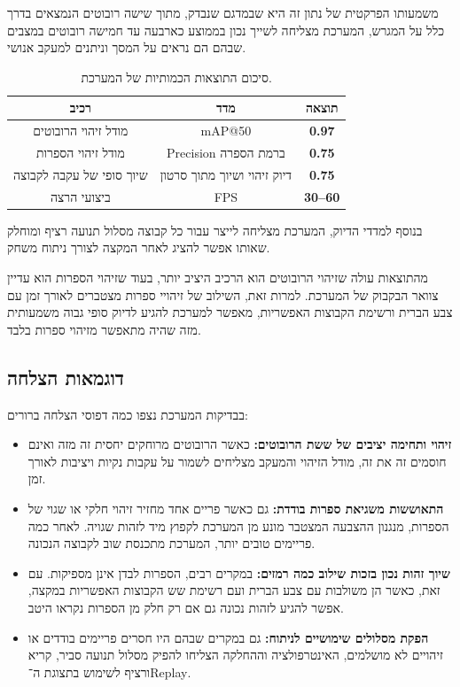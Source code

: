 משמעותו הפרקטית של נתון זה היא שבמדגם שנבדק, מתוך שישה רובוטים
הנמצאים בדרך כלל על המגרש, המערכת מצליחה לשייך נכון בממוצע כארבעה עד
חמישה רובוטים במצבים שבהם הם נראים על המסך וניתנים למעקב אנושי.

\begin{table}[H]
  \centering
  \begin{tabular}{|c|c|c|}
    \hline
    \textbf{רכיב} & \textbf{מדד} & \textbf{תוצאה} \\ \hline
    מודל זיהוי הרובוטים & \textenglish{mAP@50} & \textbf{0.97} \\ \hline
    מודל זיהוי הספרות &\textenglish{Precision}  ברמת הספרה & \textbf{0.75} \\ \hline
    שיוך סופי של עקבה לקבוצה & דיוק זיהוי ושיוך מתוך סרטון & \textbf{0.75} \\ \hline
    ביצועי הרצה & \textenglish{FPS} & \textbf{30--60} \\ \hline
  \end{tabular}
  \caption{סיכום התוצאות הכמותיות של המערכת.}
\end{table}

בנוסף למדדי הדיוק, המערכת מצליחה לייצר עבור כל קבוצה מסלול תנועה רציף
ומוחלק שאותו אפשר להציג לאחר המקצה לצורך ניתוח משחק.

מהתוצאות עולה שזיהוי הרובוטים הוא הרכיב היציב יותר, בעוד שזיהוי הספרות
הוא עדיין צוואר הבקבוק של המערכת. למרות זאת, השילוב של זיהויי ספרות
מצטברים לאורך זמן עם צבע הברית ורשימת הקבוצות האפשריות, מאפשר למערכת
להגיע לדיוק סופי גבוה משמעותית מזה שהיה מתאפשר מזיהוי ספרות בלבד.

\subsection{דוגמאות הצלחה}

בבדיקות המערכת נצפו כמה דפוסי הצלחה ברורים:

\begin{itemize}
\item \textbf{זיהוי ותחימה יציבים של ששת הרובוטים:} כאשר הרובוטים
  מרוחקים יחסית זה מזה ואינם חוסמים זה את זה, מודל הזיהוי והמעקב
  מצליחים לשמור על עקבות נקיות ויציבות לאורך זמן.

\item \textbf{התאוששות משגיאת ספרות בודדת:} גם כאשר פריים אחד מחזיר
  זיהוי חלקי או שגוי של הספרות, מנגנון ההצבעה המצטבר מונע מן המערכת
  לקפוץ מיד לזהות שגויה. לאחר כמה פריימים טובים יותר, המערכת מתכנסת
  שוב לקבוצה הנכונה.

\item \textbf{שיוך זהות נכון בזכות שילוב כמה רמזים:} במקרים רבים,
  הספרות לבדן אינן מספיקות. עם זאת, כאשר הן משולבות עם צבע הברית ועם
  רשימת שש הקבוצות האפשריות במקצה, אפשר להגיע לזהות נכונה גם אם רק חלק
  מן הספרות נקראו היטב.

\item \textbf{הפקת מסלולים שימושיים לניתוח:} גם במקרים שבהם היו חסרים
  פריימים בודדים או זיהויים לא מושלמים, האינטרפולציה וההחלקה הצליחו
  להפיק מסלול תנועה סביר, קריא ורציף לשימוש בתצוגת
  ה־\textenglish{Replay}.
\end{itemize}

